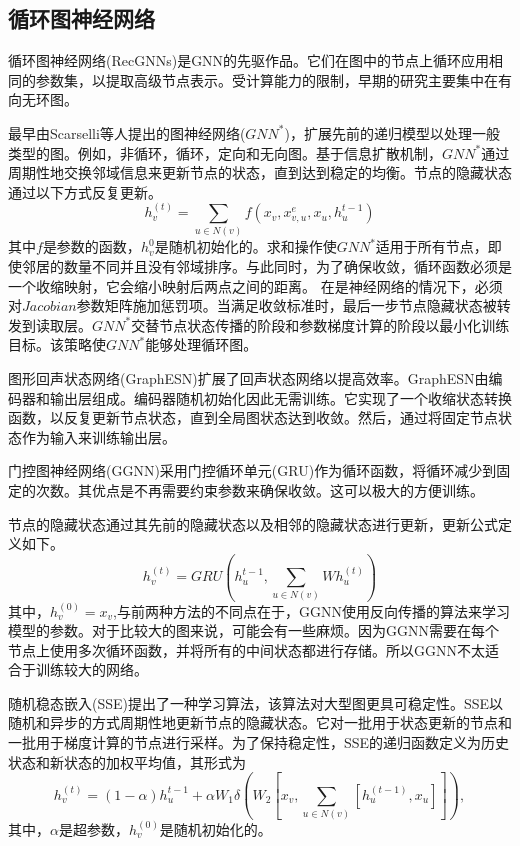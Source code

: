 \subsection{循环图神经网络}
循环图神经网络(RecGNNs)是GNN的先驱作品。它们在图中的节点上循环应用相同的参数集，以提取高级节点表示。受计算能力的限制，早期的研究主要集中在有向无环图。

最早由Scarselli等人提出的图神经网络($GNN^*$)\cite{scarselli2008graph}，扩展先前的递归模型以处理一般类型的图。例如，非循环，循环，定向和无向图。基于信息扩散机制，$GNN^*$通过周期性地交换邻域信息来更新节点的状态，直到达到稳定的均衡。节点的隐藏状态通过以下方式反复更新。
\[
h_v^{(t)}=\sum_{u\in N(v)}f(x_v,x^e_{v,u},x_u,h_u^{t-1})
\]
其中$f$是参数的函数，$h_v^{0}$是随机初始化的。求和操作使$GNN^*$适用于所有节点，即使邻居的数量不同并且没有邻域排序。与此同时，为了确保收敛，循环函数必须是一个收缩映射，它会缩小映射后两点之间的距离。
在是神经网络的情况下，必须对$Jacobian$参数矩阵施加惩罚项。当满足收敛标准时，最后一步节点隐藏状态被转发到读取层。$GNN^*$交替节点状态传播的阶段和参数梯度计算的阶段以最小化训练目标。该策略使$GNN^*$能够处理循环图。

图形回声状态网络(GraphESN)扩展了回声状态网络以提高效率。GraphESN由编码器和输出层组成。编码器随机初始化因此无需训练。它实现了一个收缩状态转换函数，以反复更新节点状态，直到全局图状态达到收敛。然后，通过将固定节点状态作为输入来训练输出层。

门控图神经网络(GGNN)采用门控循环单元(GRU)作为循环函数，将循环减少到固定的次数。其优点是不再需要约束参数来确保收敛。这可以极大的方便训练。

节点的隐藏状态通过其先前的隐藏状态以及相邻的隐藏状态进行更新，更新公式定义如下。
\[
h_v^{(t)}=GRU(h_u^{t-1},\sum_{u\in N(v)} Wh_u^{(t)})
\]
其中，$h_v^{(0)}=x_v$,与前两种方法的不同点在于，GGNN使用反向传播的算法来学习模型的参数。对于比较大的图来说，可能会有一些麻烦。因为GGNN需要在每个节点上使用多次循环函数，并将所有的中间状态都进行存储。所以GGNN不太适合于训练较大的网络。

随机稳态嵌入(SSE)提出了一种学习算法，该算法对大型图更具可稳定性。SSE以随机和异步的方式周期性地更新节点的隐藏状态。它对一批用于状态更新的节点和一批用于梯度计算的节点进行采样。为了保持稳定性，SSE的递归函数定义为历史状态和新状态的加权平均值，其形式为
\[
h_v^{(t)}=(1-\alpha)h_u^{t-1}+\alpha W_1\delta(W_2[x_v,\sum_{u\in N(v)}[h_u^{(t-1)},x_u]]) ,
\]
其中，$\alpha$是超参数，$h_v^{(0)}$是随机初始化的。


